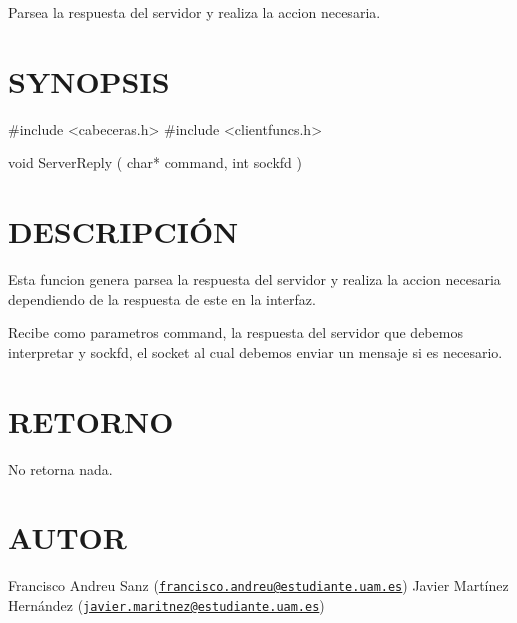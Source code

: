 Parsea la respuesta del servidor y realiza la accion necesaria.\hypertarget{unknown_case_SYNOPSIS}{}\section{S\-Y\-N\-O\-P\-S\-I\-S}\label{unknown_case_SYNOPSIS}
\begin{DoxyVerb} #include  <cabeceras.h>
   #include  <clientfuncs.h>

 void ServerReply ( char* command, int  sockfd  )
\end{DoxyVerb}
\hypertarget{unknown_case_descripcion}{}\section{D\-E\-S\-C\-R\-I\-P\-C\-IÓ\-N}\label{unknown_case_descripcion}
Esta funcion genera parsea la respuesta del servidor y realiza la accion necesaria dependiendo de la respuesta de este en la interfaz.

Recibe como parametros command, la respuesta del servidor que debemos interpretar y sockfd, el socket al cual debemos enviar un mensaje si es necesario.\hypertarget{unknown_case_retorno}{}\section{R\-E\-T\-O\-R\-N\-O}\label{unknown_case_retorno}
No retorna nada.\hypertarget{unknown_case_authors}{}\section{A\-U\-T\-O\-R}\label{unknown_case_authors}
Francisco Andreu Sanz (\href{mailto:francisco.andreu@estudiante.uam.es}{\tt francisco.\-andreu@estudiante.\-uam.\-es}) Javier Martínez Hernández (\href{mailto:javier.maritnez@estudiante.uam.es}{\tt javier.\-maritnez@estudiante.\-uam.\-es}) 

 